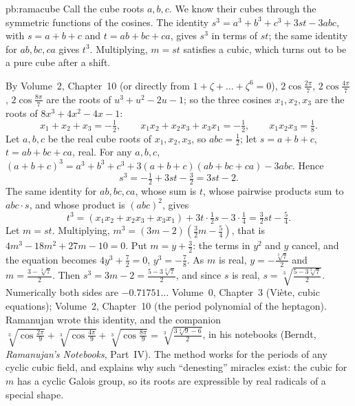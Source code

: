 \begin{solution}{pb:ramacube}
\idea Call the cube roots $a,b,c$. We know their cubes through the symmetric functions of the cosines. The identity
$s^3=a^3+b^3+c^3+3st-3abc$, with $s=a+b+c$ and $t=ab+bc+ca$, gives $s^3$ in terms of $st$; the same identity for $ab,bc,ca$
gives $t^3$. Multiplying, $m=st$ satisfies a cubic, which turns out to be a pure cube after a shift.

\writeup By Volume~2, Chapter~10 (or directly from $1+\zeta+\dots+\zeta^6=0$), $2\cos\frac{2\pi}7$, $2\cos\frac{4\pi}7$,
$2\cos\frac{8\pi}7$ are the roots of $u^3+u^2-2u-1$; so the three cosines $x_1,x_2,x_3$ are the roots of $8x^3+4x^2-4x-1$:
\[
x_1+x_2+x_3=-\tfrac12,\qquad x_1x_2+x_2x_3+x_3x_1=-\tfrac12,\qquad x_1x_2x_3=\tfrac18.
\]
Let $a,b,c$ be the real cube roots of $x_1,x_2,x_3$, so $abc=\frac12$; let $s=a+b+c$, $t=ab+bc+ca$, real. For any $a,b,c$,
$(a+b+c)^3=a^3+b^3+c^3+3(a+b+c)(ab+bc+ca)-3abc$. Hence
\[
s^3=-\tfrac12+3st-\tfrac32=3st-2.
\]
The same identity for $ab,bc,ca$, whose sum is $t$, whose pairwise products sum to $abc\cdot s$, and whose product is
$(abc)^2$, gives
\[
t^3=(x_1x_2+x_2x_3+x_3x_1)+3t\cdot\tfrac12s-3\cdot\tfrac14=\tfrac32st-\tfrac54.
\]
Let $m=st$. Multiplying, $m^3=(3m-2)(\frac32m-\frac54)$, that is $4m^3-18m^2+27m-10=0$. Put $m=y+\frac32$: the terms in $y^2$
and $y$ cancel, and the equation becomes $4y^3+\frac72=0$, $y^3=-\frac78$. As $m$ is real, $y=-\frac{\sqrt[3]7}2$ and
$m=\frac{3-\sqrt[3]7}2$. Then $s^3=3m-2=\frac{5-3\sqrt[3]7}2$, and since $s$ is real, $s=\sqrt[3]{\frac{5-3\sqrt[3]7}2}$.
Numerically both sides are $-0.71751\ldots$
\tools Volume~0, Chapter~3 (Viète, cubic equations); Volume~2, Chapter~10 (the period polynomial of the heptagon).
\leads Ramanujan wrote this identity, and the companion
$\sqrt[3]{\cos\frac{2\pi}9}+\sqrt[3]{\cos\frac{4\pi}9}+\sqrt[3]{\cos\frac{8\pi}9}=\sqrt[3]{\frac{3\sqrt[3]9-6}2}$, in his notebooks
(Berndt, \emph{Ramanujan's Notebooks}, Part~IV). The method works for the periods of any cyclic cubic field, and explains
why such ``denesting'' miracles exist: the cubic for $m$ has a cyclic Galois group, so its roots are expressible by real
radicals of a special shape.
\end{solution}

